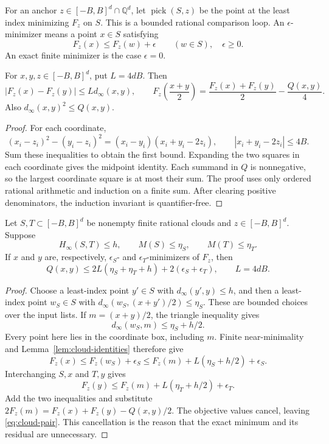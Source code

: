 For an anchor \(z\in[-B,B]^d\cap\mathbb Q^d\), let
\(\operatorname{pick}(S,z)\) be the point at the least index minimizing
\(F_z\) on \(S\).  This is a bounded rational comparison loop.  An
\(\epsilon\)-minimizer means a point \(x\in S\) satisfying
\[
 F_z(x)\leq F_z(w)+\epsilon\qquad(w\in S),
 \quad \epsilon\geq 0.
\]
An exact finite minimizer is the case \(\epsilon=0\).

\begin{lemma}
\label{lem:cloud-identities}
For \(x,y,z\in[-B,B]^d\), put \(L=4dB\).  Then
\[
 |F_z(x)-F_z(y)|\leq Ld_\infty(x,y),
 \qquad
 F_z\left(\frac{x+y}{2}\right)
   =\frac{F_z(x)+F_z(y)}2-\frac{Q(x,y)}4.
\]
Also \(d_\infty(x,y)^2\leq Q(x,y)\).
\end{lemma}

\begin{proof}
For each coordinate,
\[
 (x_i-z_i)^2-(y_i-z_i)^2
 =(x_i-y_i)(x_i+y_i-2z_i),
 \qquad |x_i+y_i-2z_i|\leq4B.
\]
Sum these inequalities to obtain the first bound.  Expanding the two squares
in each coordinate gives the midpoint identity.  Each summand in \(Q\) is
nonnegative, so the largest coordinate square is at most their sum.
The proof uses only ordered rational arithmetic and induction on a finite
sum.  After clearing positive denominators, the induction invariant is
quantifier-free.
\end{proof}

\begin{theorem}
\label{thm:cloud-pair}
Let \(S,T\subset[-B,B]^d\) be nonempty finite rational clouds and
\(z\in[-B,B]^d\).  Suppose
\[
 H_\infty(S,T)\leq h,\qquad M(S)\leq\eta_S,
 \qquad M(T)\leq\eta_T.
\]
If \(x\) and \(y\) are, respectively, \(\epsilon_S\)- and
\(\epsilon_T\)-minimizers of \(F_z\), then
\begin{equation}
 \label{eq:cloud-pair}
 Q(x,y)\leq
  2L(\eta_S+\eta_T+h)+2(\epsilon_S+\epsilon_T),
 \qquad L=4dB.
\end{equation}
\end{theorem}

\begin{proof}
Choose a least-index point \(y'\in S\) with
\(d_\infty(y',y)\leq h\), and then a least-index point \(w_S\in S\)
with
\(d_\infty(w_S,(x+y')/2)\leq\eta_S\).  These are bounded choices
over the input lists.  If \(m=(x+y)/2\), the triangle inequality gives
\[
 d_\infty(w_S,m)\leq\eta_S+h/2.
\]
Every point here lies in the coordinate box, including \(m\).  Finite
near-minimality and Lemma~\ref{lem:cloud-identities} therefore give
\[
 F_z(x)\leq F_z(w_S)+\epsilon_S
 \leq F_z(m)+L(\eta_S+h/2)+\epsilon_S.
\]
Interchanging \(S,x\) and \(T,y\) gives
\[
 F_z(y)\leq F_z(m)+L(\eta_T+h/2)+\epsilon_T.
\]
Add the two inequalities and substitute
\(2F_z(m)=F_z(x)+F_z(y)-Q(x,y)/2\).
The objective values cancel, leaving \eqref{eq:cloud-pair}.
This cancellation is the reason that the exact minimum and its residual are
unnecessary.
\end{proof}

